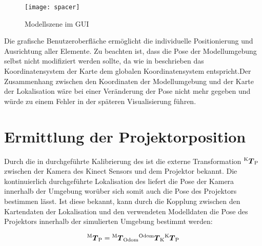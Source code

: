 \begin{figure}[!ht]
	\begin{center}
		\texttt{[image: spacer]}
		\caption{Modellszene im GUI}
		\label{fig.modscene}
	\end{center}
\end{figure}

Die grafische Benutzeroberfläche ermöglicht die individuelle Positionierung und Ausrichtung aller Elemente. Zu beachten ist, dass die Pose der Modellumgebung selbst nicht modifiziert werden sollte, da wie in  beschrieben das Koordinatensystem der Karte dem globalen Koordinatensystem entspricht. Der Zusammenhang zwischen den Koordinaten der Modellumgebung und der Karte der Lokalisation wäre bei einer Veränderung der Pose nicht mehr gegeben und würde zu einem Fehler in der späteren Visualisierung führen. 


\section{Ermittlung der Projektorposition}
Durch die in  durchgeführte Kalibrierung des  ist die externe Transformation ${^{\mathrm{K}}\mbox{\boldmath{$T$}}_{\mathrm{P}}}$ zwischen der Kamera des Kinect Sensors und dem Projektor bekannt. Die kontinuierlich durchgeführte Lokalisation des  liefert die Pose der Kamera innerhalb der Umgebung worüber sich somit auch die Pose des Projektors bestimmen lässt. Ist diese bekannt, kann durch die Kopplung zwischen den Kartendaten der Lokalisation und den verwendeten Modelldaten die Pose des Projektors innerhalb der simulierten Umgebung bestimmt werden:

\begin{equation}
{^{\mathrm{M}}\mbox{\boldmath{$T$}}_{\mathrm{P}}} = {^{\mathrm{M}}\mbox{\boldmath{$T$}}_{\mathrm{Odom}}}{^{\mathrm{Odom}}\mbox{\boldmath{$T$}}_{\mathrm{K}}}{^{\mathrm{K}}\mbox{\boldmath{$T$}}_{\mathrm{P}}}
\end{equation}

